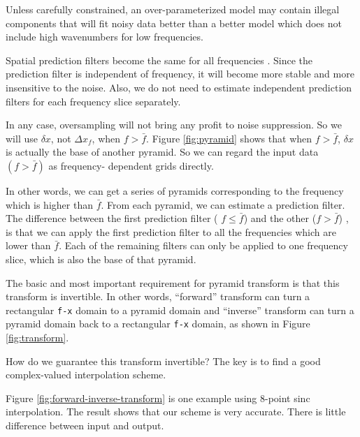 
Unless carefully constrained, an over-parameterized model may
contain illegal components that will fit noisy data better
than a better model which does not include high wavenumbers
for low frequencies. 
\par
Spatial prediction filters become the same for all frequencies
\cite[] {Nichols.1996}.
Since the prediction filter is independent of frequency, 
it will become more stable and more 
insensitive to the noise. Also, we do not need to estimate independent
prediction filters for each frequency slice separately.
\par
In any case, oversampling will not bring any profit to noise suppression. So 
we will use $\delta x$, not $\Delta x_f$, when $f>\bar{f}$. 
Figure \ref{fig:pyramid} shows that when $f>\bar{f}$, $\delta x$ is actually the 
base of another pyramid. So we can regard the input data $(f>\bar{f})$ as 
frequency- dependent grids directly.
\par
In other words, we can get a series of pyramids corresponding to the 
frequency which is higher than $\bar{f}$. From each pyramid, we can estimate 
a prediction filter. The difference between the first prediction filter (
$f \le \bar{f}$) and the other ($f>\bar{f}$) , 
is that we can apply the first prediction filter to all the frequencies which 
are lower than $\bar{f}$. 
Each of the remaining filters can only be applied to one frequency slice, 
which is also the base of that pyramid. 

\par
The basic and most important requirement for pyramid 
transform is that this transform is invertible. In other words, ``forward'' 
transform can turn a rectangular {\tt f-x} domain to a pyramid domain and 
``inverse'' transform can turn a pyramid domain back to a rectangular {\tt f-x}
 domain, as shown in Figure \ref{fig:transform}.



How do we guarantee this transform invertible? The key is to find a good 
complex-valued interpolation scheme. 
\begin{comment}
Here, we use Dave Hale's 8-point sinc 
interpolation program in SU. Some more accurate and complicated interpolation 
scheme can be found in Wade's paper \shortcite{SEG.1988.SP1.6}. 
\end{comment}
Figure \ref{fig:forward-inverse-transform} is one example using 8-point sinc 
interpolation. 
The result shows that our scheme is very accurate. There is little difference 
between input and output.

